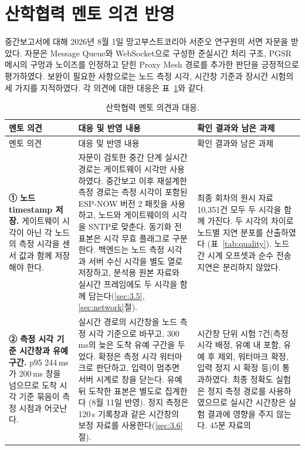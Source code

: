 \documentclass[11pt,a4paper]{article}
\begin{document}
\section{산학협력 멘토 의견 반영}
\label{sec:mentor}

중간보고서에 대해 2026년 8월 1일 망고부스트코리아 서준오 연구원의 서면 자문을 받았다. 자문은 Message Queue와
WebSocket으로 구성한 준실시간 처리 구조, PGSR 메시의 구멍과 노이즈를 인정하고 닫힌 Proxy Mesh 경로를 추가한 판단을
긍정적으로 평가하였다. 보완이 필요한 사항으로는 노드 측정 시각, 시간창 기준과 장시간 시험의 세 가지를 지적하였다.
각 의견에 대한 대응은 표~\ref{tab:mentor}와 같다.

{\small
\renewcommand{\arraystretch}{1.2}
\begin{longtable}{@{}>{\raggedright\arraybackslash}p{3.6cm}
  >{\raggedright\arraybackslash}p{5.6cm}
  >{\raggedright\arraybackslash}p{5.7cm}@{}}
\caption{산학협력 멘토 의견과 대응.}\label{tab:mentor}\\
\toprule
멘토 의견 & 대응 및 반영 내용 & 확인 결과와 남은 과제 \\
\midrule
\endfirsthead
\toprule
멘토 의견 & 대응 및 반영 내용 & 확인 결과와 남은 과제 \\
\midrule
\endhead
\bottomrule
\endfoot
\textbf{① 노드 timestamp 저장.} 게이트웨이 시각이 아닌 각 노드의 측정 시각을 센서 값과 함께
저장해야 한다. &
자문이 검토한 중간 단계 실시간 경로는 게이트웨이 시각만 사용하였다. 중간보고 이후 재설계한 측정 경로는 측정 시각이
포함된 ESP-NOW 버전 2 패킷을 사용하고, 노드와 게이트웨이의 시각을 SNTP로 맞춘다. 동기화 전 표본은 시각 무효
플래그로 구분한다. 백엔드는 노드 측정 시각과 서버 수신 시각을 별도 열로 저장하고, 분석용 원본 자료와 실시간 프레임에도
두 시각을 함께 담는다(\ref{sec:3.5}, \ref{sec:network}절). &
최종 회차의 원시 자료 10,351건 모두 두 시각을 함께 가진다. 두 시각의 차이로 노드별 지연 분포를 산출하였다
(표~\ref{tab:quality}). 노드 간 시계 오프셋과 순수 전송 지연은 분리하지 않았다. \\
\midrule
\textbf{② 측정 시각 기준 시간창과 유예 구간.} p95 244\,ms가 200\,ms 창을 넘으므로 도착
시각 기준 묶음이 측정 시점과 어긋난다. &
실시간 경로의 시간창을 노드 측정 시각 기준으로 바꾸고, 300\,ms의 늦은 도착 유예 구간을 두었다. 확정은 측정 시각
워터마크로 판단하고, 입력이 멈추면 서버 시계로 창을 닫는다. 유예 뒤 도착한 표본은 별도로 집계한다
(8월 11일 반영). 정지 측정은 120\,s 기록창과 같은 시간창의 보정 자료를 사용한다(\ref{sec:3.6}절). &
시간창 단위 시험 7건(측정 시각 배정, 유예 내 포함, 유예 후 제외, 워터마크 확정, 입력 정지 시 확정 등)이 통과하였다.
최종 정확도 실험은 정지 측정 경로를 사용하였으므로 실시간 시간창은 실험 결과에 영향을 주지 않는다. 45분 자료의

\end{longtable}}
\end{document}
